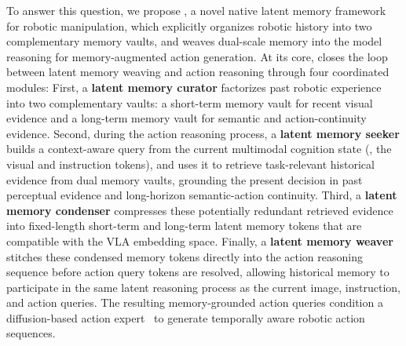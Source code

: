 To answer this question, we propose \ourmethod, a novel native latent memory framework for robotic manipulation, which explicitly organizes robotic history into two complementary memory vaults, and weaves dual-scale memory into the model reasoning for memory-augmented action generation.
At its core, \ourmethod closes the loop between latent memory weaving and action reasoning through four coordinated modules:
First,  a \textbf{latent memory curator} factorizes past robotic experience into two complementary vaults: a short-term memory vault for recent visual evidence and a long-term memory vault for semantic and action-continuity evidence.
Second, during the action reasoning process,  a \textbf{latent memory seeker} builds a context-aware query from the current multimodal cognition state (\ie, the visual and instruction tokens), and uses it to retrieve task-relevant historical evidence from dual memory vaults, grounding the present decision in past perceptual evidence and long-horizon semantic-action continuity. 
Third,  a \textbf{latent memory condenser} compresses these potentially redundant retrieved evidence into fixed-length short-term and long-term latent memory tokens that are compatible with the VLA embedding space.
Finally,  a \textbf{latent memory weaver} stitches these condensed memory tokens directly into the action reasoning sequence before action query tokens are resolved, allowing historical memory to participate in the same latent reasoning process as the current image, instruction, and action queries.
The resulting memory-grounded action queries condition a diffusion-based action expert~\cite{chi2025diffusion,peebles2023scalable} to generate temporally aware robotic action sequences.


